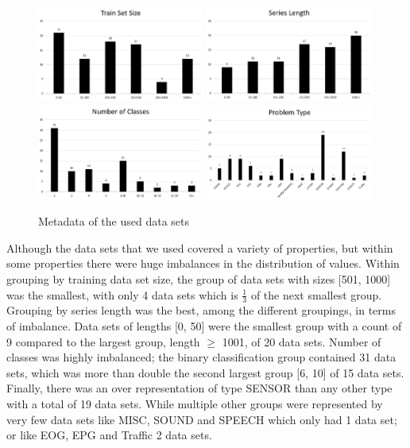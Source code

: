 \begin{figure}
    \captionsetup{justification=raggedright}
    \includegraphics[width=0.49\textwidth,keepaspectratio]{Train_size_hist.JPG}
    \includegraphics[width=0.49\textwidth,keepaspectratio]{Length_hist.JPG}
    \\[\smallskipamount]
    \includegraphics[width=0.49\textwidth,keepaspectratio]{Classes_hist.JPG}
    \includegraphics[width=0.49\textwidth,keepaspectratio]{Problem_hist.JPG}
    \caption{Metadata of the used data sets}
    \label{fig:DatasetsMetadata}
\end{figure}

Although the data sets that we used covered a variety of properties, but within some properties there were huge imbalances in the distribution of values.
Within grouping by training data set size, the group of data sets with sizes [501, 1000] was the smallest, with only 4 data sets which is $\frac{1}{3}$ of the next smallest group.
Grouping by series length was the best, among the different groupings, in terms of imbalance. Data sets of lengths [0, 50] were the smallest group with a count of 9 compared to the largest group, length $\geq$ 1001, of 20 data sets.
Number of classes was highly imbalanced; the binary classification group contained 31 data sets, which was more than double the second largest group [6, 10] of 15 data sets.
Finally, there was an over representation of type SENSOR than any other type with a total of 19 data sets.
While multiple other groups were represented by very few data sets like MISC, SOUND and SPEECH which only had 1 data set; or like EOG, EPG and Traffic 2 data sets.

